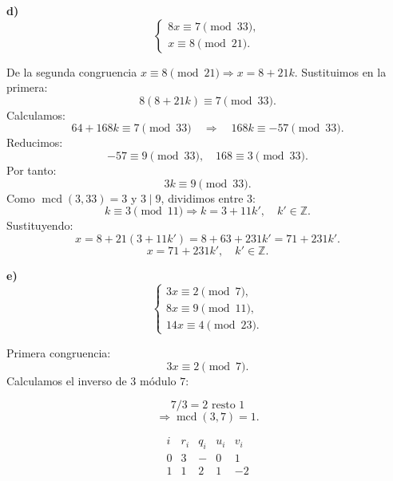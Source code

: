 \documentclass[a4paper,12pt]{article}
\begin{document}
\begin{ejercicio}[title=Ejercicio 37]

\textbf{d)} \\[0.3em]
\[
\begin{cases}
8x \equiv 7 \pmod{33},\\
x \equiv 8 \pmod{21}.
\end{cases}
\]

De la segunda congruencia $x \equiv 8 \pmod{21}\Rightarrow x = 8 + 21k$. Sustituimos en la primera:
\[
8(8 + 21k) \equiv 7 \pmod{33}.
\]
Calculamos:
\[
64 + 168k \equiv 7 \pmod{33} \quad\Rightarrow\quad 168k \equiv -57 \pmod{33}.
\]
Reducimos:
\[
-57 \equiv 9 \pmod{33},\quad 168 \equiv 3 \pmod{33}.
\]
Por tanto:
\[
3k \equiv 9 \pmod{33}.
\]
Como $\operatorname{mcd}(3,33) = 3$ y $3\mid 9$, dividimos entre $3$:
\[
k \equiv 3 \pmod{11} \Rightarrow k = 3 + 11k',\quad k'\in \mathbb{Z}.
\]
Sustituyendo:
\[
x = 8 + 21(3 + 11k') = 8 + 63 + 231k' = 71 + 231k'.
\]
\[
\boxed{x = 71 + 231k',\quad k'\in \mathbb{Z}.}
\]

\vspace{0.8em}

\textbf{e)} \\[0.3em]
\[
\begin{cases}
3x \equiv 2 \pmod{7},\\
8x \equiv 9 \pmod{11},\\
14x \equiv 4 \pmod{23}.
\end{cases}
\]

Primera congruencia:
\[
3x \equiv 2 \pmod{7}.
\]
Calculamos el inverso de $3$ módulo $7$:

\[
7 / 3 = 2 \text{ resto } \boxed{1}
\]
\[
\Rightarrow \operatorname{mcd}(3,7) = 1.
\]

\[
\begin{array}{c|c|c|c|c}
i & r_i & q_i & u_i & v_i \\ \hline
0 & 3 & - & 0 & 1 \\
1 & \boxed{1} & 2 & 1 & -2 \\
\end{array}
\]

\end{ejercicio}
\end{document}
